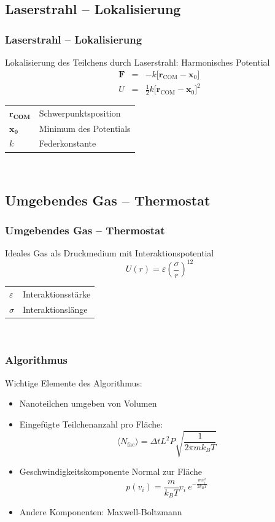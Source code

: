 \documentclass{beamer}
\begin{document}
\subsection{Laserstrahl -- Lokalisierung}
\begin{frame} 
\frametitle{Laserstrahl -- Lokalisierung}
Lokalisierung des Teilchens durch Laserstrahl: Harmonisches Potential
\begin{eqnarray}
    \mathbf{F} &=& -k \Big[\mathbf{r}_\text{COM}-\mathbf{x}_0\Big]\\
    U &=& \frac12 k \Big[\mathbf{r}_\text{COM}-\mathbf{x}_0\Big]^2
\end{eqnarray}
\begin{tabular}{l l}
$\mathbf{r_\text{COM}}$ & Schwerpunktsposition\\
$\mathbf{x_0}$ & Minimum des Potentials\\
$k$ & Federkonstante\\
\end{tabular}\\
\end{frame}

\subsection{Umgebendes Gas -- Thermostat}
\begin{frame}
\frametitle{Umgebendes Gas -- Thermostat}
Ideales Gas als Druckmedium mit Interaktionspotential
\begin{equation}
    \label{eq:softsphere}
    U(r) = \varepsilon \left(\frac{\sigma}{r}\right)^{12}
\end{equation}
\begin{tabular}{l l}
$\varepsilon$ & Interaktionsstärke\\
$\sigma$ & Interaktionslänge\\
\end{tabular}\\
\end{frame}

\begin{frame}
\frametitle{Algorithmus}
Wichtige Elemente des Algorithmus:
\begin{itemize}
\item Nanoteilchen umgeben von Volumen
\item Eingefügte Teilchenanzahl pro Fläche: 
\begin{equation}
    \langle N_\text{fac}\rangle = \Delta t L^2 P \sqrt{\frac{1}{2\pi m k_B T}}
\end{equation}
\item Geschwindigkeitskomponente Normal zur Fläche
\begin{equation}
    p(v_i) = \frac{m}{k_B T}v_i \ e^{-\frac{mv_i^2}{2k_BT}}
\end{equation}
\item Andere Komponenten: Maxwell-Boltzmann
\end{itemize}
\end{frame}
\end{document}
